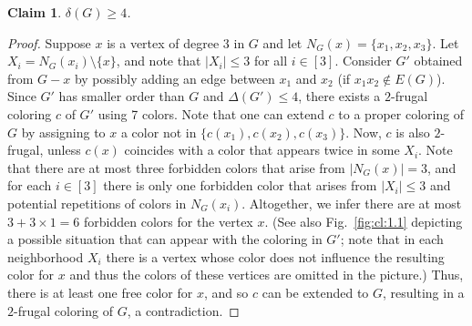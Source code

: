 \documentclass[10pt,a4paper]{article}
\newtheorem{claim}{Claim}
\begin{document}
\begin{claim} $\delta(G)\ge 4$.
\label{cl:1.1}
\end{claim} 
\begin{proof}
Suppose $x$ is a vertex of degree $3$ in $G$ and let $N_G(x)=\{x_1,x_2,x_3\}$. Let $X_i=N_G(x_i)\setminus\{x\}$, and note that $|X_i|\le 3$ for all $i\in [3]$. Consider $G'$ obtained from $G-x$ by possibly adding an edge between $x_1$ and $x_2$ (if $x_1x_2\notin E(G)$). Since $G'$ has smaller order than $G$ and $\Delta(G')\le 4$, there exists a $2$-frugal coloring $c$ of $G'$ using 7 colors. Note that one can extend $c$ to a proper coloring of $G$ by assigning to $x$ a color not in $\{c(x_1),c(x_2),c(x_3)\}$. Now, $c$ is also $2$-frugal, unless $c(x)$ coincides with a color that appears twice in some $X_i$. Note that there are at most three forbidden colors that arise from $|N_G(x)|=3$, and for each $i\in [3]$ there is only one forbidden color that arises from $|X_i|\le 3$ and potential repetitions of colors in $N_G(x_i)$. Altogether, we infer there are at most $3+3\times 1=6$ forbidden colors for the vertex $x$. (See also Fig.~\ref{fig:cl:1.1} depicting a possible situation that can appear with the coloring in $G'$; note that in each neighborhood $X_i$ there is a vertex whose color does not influence the resulting color for $x$ and thus the colors of these vertices are omitted in the picture.) Thus, there is at least one free color for $x$, and so $c$ can be extended to $G$, resulting in a $2$-frugal coloring of $G$, a contradiction.
\end{proof}
\end{document}
